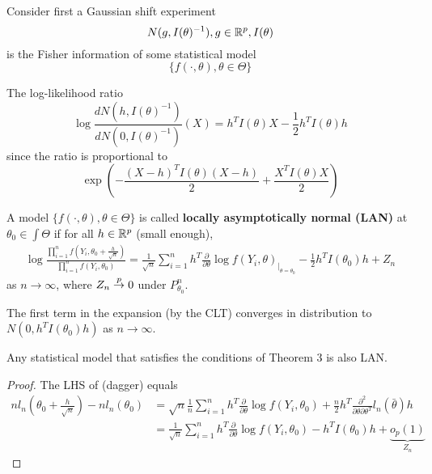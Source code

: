 Consider first a Gaussian shift experiment
\begin{equation}
  \label{eq:84}
  N(g, I(\theta)^{-1}), g \in \mathbb{R}^{p}, I(\theta)
\end{equation} is the Fisher information of some statistical model
\begin{equation}
  \label{eq:85}
  \{ f(\cdot, \theta), \theta \in \Theta \}
\end{equation}

The log-likelihood ratio
\begin{equation}
  \label{eq:86}
  \log \frac{dN(h, I(\theta)^{-1})}{dN(0, I(\theta)^{-1})}(X) = h^{T}
  I(\theta)X - \frac{1}{2}h^{T}I(\theta) h
\end{equation} since the ratio is proportional to
\begin{equation}
  \label{eq:87}
  \exp \left( - \frac{(X-h)^{T} I(\theta)(X-h)}{2} +
    \frac{X^{T}I(\theta)X}{2} \right)
\end{equation}

\begin{defn}
  \label{defn:parametric_statistical_models:10}
  A model $\{ f(\cdot, \theta), \theta \in \Theta \}$ is called
  \textbf{locally asymptotically normal (LAN)} at $\theta_{0} \in \int
  \Theta$ if for all $h \in \mathbb{R}^{p}$ (small enough),
  \begin{align}
    \label{eq:88}
    \log \frac{\prod_{i=1}^{n} f(Y_{i}, \theta_{0} +
      \frac{h}{\sqrt{n}})}{\prod_{i=1}^{n} f(Y_{i}, \theta_{0})} =
    \frac{1}{\sqrt{n}} \sum_{i=1}^{n} h^{T} \frac{\partial}{\partial
      \theta} \log f(Y_{i}, \theta)_{|_{\theta = \theta_{0}}} -
    \frac{1}{2} h^{T} I(\theta_{0}) h + Z_{n}
  \end{align} as $n \rightarrow \infty$, where $Z_{n} \overset{p}{\rightarrow} 0$ under $P_{\theta_{0}}^{n}$.
\end{defn}

\begin{remark}
  The first term in the expansion (by the CLT) converges in
  distribution to $N(0, h^{T} I(\theta_{0}) h)$ as $n \rightarrow
  \infty$.
\end{remark}


\begin{proposition}
  Any statistical model that satisfies the conditions of Theorem 3 is
  also LAN.
\end{proposition}

\begin{proof}
  The LHS of (dagger)  equals
  \begin{align}
    \label{eq:89}
    n l_{n}(\theta_{0} + \frac{h}{\sqrt{n}}) - n l_{n}(\theta_{0}) &=
    \sqrt{n} \frac{1}{n} \sum_{i=1}^{n} h^{T} \frac{\partial}{\partial
    \theta} \log f(Y_{i}, \theta_{0}) + \frac{n}{2} h^{T}
  \frac{\partial^{2}}{\partial \theta \partial \theta^{T}} l_{n}(\bar
  \theta) h  \\
  &= \frac{1}{\sqrt{n}} \sum_{i=1}^{n} h^{T} \frac{\partial}{\partial
    \theta} \log f(Y_{i}, \theta_{0}) - h^{T}I(\theta_{0})h + \underbrace{o_{p}(1)}_{Z_{n}}
  \end{align}
\end{proof}

